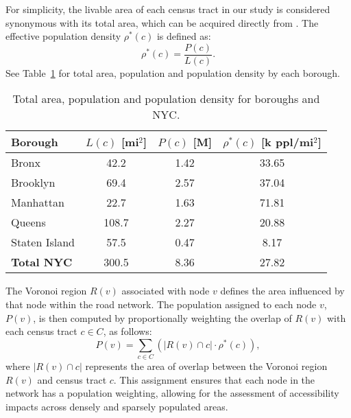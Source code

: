 For simplicity, the livable area of each census tract in our study is considered synonymous with its total area, which can be acquired directly from \cite{bureau2023census}.
The effective population density \( \rho^*(c) \) is defined as:
\begin{equation}
    \rho^*(c) = \frac{P(c)}{L(c)}.
\end{equation}
See Table~\ref{tab:population_density_by_borough} for total area, population and population density by each borough.
\begin{table}[ht]
    \centering
    \renewcommand{\arraystretch}{1.2} %
    \setlength{\tabcolsep}{10pt} %
    \begin{tabular}{lccc}
        \toprule
        \textbf{Borough} & \textbf{$L(c)$ [mi$^2$]} & \textbf{$P(c)$ [M]} & \textbf{$\rho^*(c)$ [k ppl/mi$^2$]} \\
        \midrule
        Bronx          & 42.2  & 1.42 & 33.65 \\
        Brooklyn       & 69.4  & 2.57 & 37.04 \\
        Manhattan      & 22.7  & 1.63 & 71.81 \\
        Queens         & 108.7 & 2.27 & 20.88 \\
        Staten Island  & 57.5  & 0.47 & 8.17  \\
        \midrule
        \textbf{Total NYC} & 300.5 & 8.36 & 27.82 \\
        \bottomrule
    \end{tabular}
    \caption{Total area, population and population density for boroughs and NYC.}
    \label{tab:population_density_by_borough}
\end{table}

The Voronoi region \( R(v) \) associated with node \( v \) defines the area influenced by that node within the road network. The population assigned to each node \( v \), \( P(v) \), is then computed by proportionally weighting the overlap of \( R(v) \) with each census tract \( c \in C \), as follows:
\begin{equation}
    P(v) = \sum_{c \in C} \left( |R(v) \cap c| \cdot \rho^*(c) \right),
\end{equation}
where \( |R(v) \cap c| \) represents the area of overlap between the Voronoi region \( R(v) \) and census tract \( c \). This assignment ensures that each node in the network has a population weighting, allowing for the assessment of accessibility impacts across densely and sparsely populated areas.


